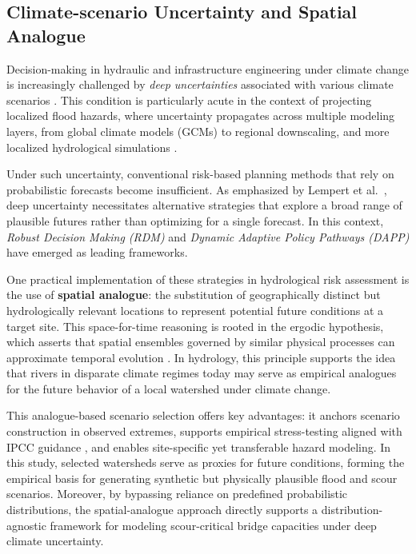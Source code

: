 \documentclass[authoryear,preprint,review,12pt]{elsarticle}
\begin{document}
\subsection{Climate-scenario Uncertainty and Spatial Analogue}

Decision-making in hydraulic and infrastructure engineering under climate change is increasingly challenged by \textit{deep uncertainties} associated with various climate scenarios \citep{IPCC2022}. This condition is particularly acute in the context of projecting localized flood hazards, where uncertainty propagates across multiple modeling layers, from global climate models (GCMs) to regional downscaling, and more localized hydrological simulations \citep{Lafferty2023}.

Under such uncertainty, conventional risk-based planning methods that rely on probabilistic forecasts become insufficient. As emphasized by Lempert et al.\ \citep{Lempert2024}, deep uncertainty necessitates alternative strategies that explore a broad range of plausible futures rather than optimizing for a single forecast. In this context, \textit{Robust Decision Making (RDM)} and \textit{Dynamic Adaptive Policy Pathways (DAPP)} have emerged as leading frameworks.

One practical implementation of these strategies in hydrological risk assessment is the use of \textbf{spatial analogue}: the substitution of geographically distinct but hydrologically relevant locations to represent potential future conditions at a target site. This space-for-time reasoning is rooted in the ergodic hypothesis, which asserts that spatial ensembles governed by similar physical processes can approximate temporal evolution \citep{Sivapalan2011}. In hydrology, this principle supports the idea that rivers in disparate climate regimes today may serve as empirical analogues for the future behavior of a local watershed under climate change.


This analogue-based scenario selection offers key advantages: it anchors scenario construction in observed extremes, supports empirical stress-testing aligned with IPCC guidance \citep{IPCC2022}, and enables site-specific yet transferable hazard modeling. In this study, selected watersheds serve as proxies for future conditions, forming the empirical basis for generating synthetic but physically plausible flood and scour scenarios. Moreover, by bypassing reliance on predefined probabilistic distributions, the spatial-analogue approach directly supports a distribution-agnostic framework for modeling scour-critical bridge capacities under deep climate uncertainty.
\end{document}
